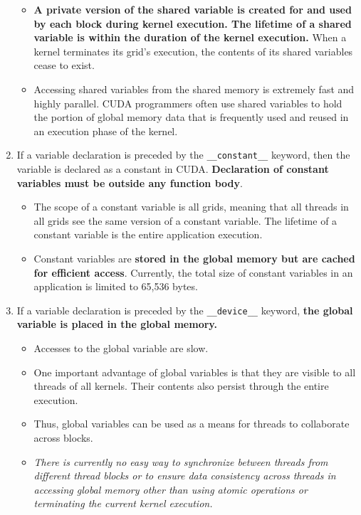 \begin{enumerate}
\begin{itemize}
              \item \textbf{A private version of the shared variable is created for and used by each block during kernel execution. The lifetime of a shared variable is within the duration of the kernel execution.} When a kernel terminates its grid's execution, the contents of its shared variables cease to exist.
              \item Accessing shared variables from the shared memory is extremely fast and highly parallel. CUDA programmers often use shared variables to hold the portion of global memory data that is frequently used and reused in an execution phase of the kernel.
          \end{itemize}
    \item If a variable declaration is preceded by the \texttt{\_\_constant\_\_} keyword, then the variable is declared as a constant in CUDA.\textbf{ Declaration of constant variables must be outside any function body}.
          \begin{itemize}
              \item The scope of a constant variable is all grids, meaning that all threads in all grids see the same version of a constant variable. The lifetime of a constant variable is the entire application execution.
              \item Constant variables are \textbf{stored in the global memory but are cached for efficient access}. Currently, the total size of constant variables in an application is limited to 65,536 bytes.
          \end{itemize}
    \item If a variable declaration is preceded by the \texttt{\_\_device\_\_} keyword, \textbf{the global variable is placed in the global memory.}
          \begin{itemize}
              \item Accesses to the global variable are slow.
              \item One important advantage of global variables is that they are visible to all threads of all kernels. Their contents also persist through the entire execution.
              \item Thus, global variables can be used as a means for threads to collaborate across blocks.
              \item \textsl{There is currently no easy way to synchronize between threads from different thread blocks or to ensure data consistency across threads in accessing global memory other than using atomic operations or terminating the current kernel execution.}

\end{itemize}
\end{enumerate}
